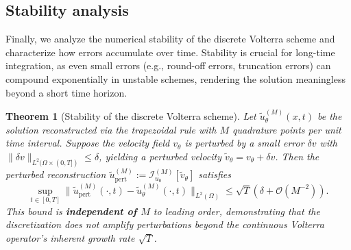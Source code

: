 \documentclass[11pt,reqno]{amsart}
\theoremstyle{plain}
\newtheorem{theorem}{Theorem}[section]
\theoremstyle{definition}
\theoremstyle{remark}
\begin{document}
\subsection{Stability analysis}

Finally, we analyze the numerical stability of the discrete Volterra scheme and characterize how errors accumulate over time. Stability is crucial for long-time integration, as even small errors (e.g., round-off errors, truncation errors) can compound exponentially in unstable schemes, rendering the solution meaningless beyond a short time horizon.

\begin{theorem}[Stability of the discrete Volterra scheme] \label{thm:stability_volterra}
Let $\tilde{u}_\theta^{(M)}(x,t)$ be the solution reconstructed via the trapezoidal rule with $M$ quadrature points per unit time interval. Suppose the velocity field $v_\theta$ is perturbed by a small error $\delta v$ with $\|\delta v\|_{L^2(\Omega \times (0,T])} \leq \delta$, yielding a perturbed velocity $\tilde{v}_\theta = v_\theta + \delta v$. Then the perturbed reconstruction $\tilde{u}_{\text{pert}}^{(M)} := \mathcal{I}_{u_0}^{(M)}[\tilde{v}_\theta]$ satisfies
\begin{equation}\label{eq:stability_bound}
    \sup_{t \in [0,T]} \|\tilde{u}_{\text{pert}}^{(M)}(\cdot, t) - \tilde{u}_\theta^{(M)}(\cdot, t)\|_{L^2(\Omega)} \leq \sqrt{T} \left( \delta + \mathcal{O}(M^{-2}) \right).
\end{equation}
This bound is \textbf{independent of $M$} to leading order, demonstrating that the discretization does not amplify perturbations beyond the continuous Volterra operator's inherent growth rate $\sqrt{T}$.
\end{theorem}
\end{document}
